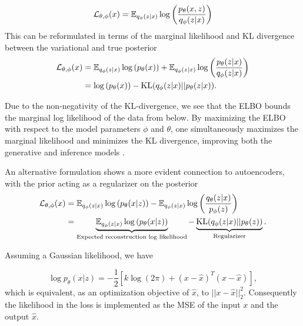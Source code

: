 \documentclass[../../thesis.tex]{subfiles}
\begin{document}
\begin{equation}
    \label{eq:ELBO}
    \mathcal{L}_{\theta,\phi}(x) 
    = \mathbb{E}_{q_\phi(z|x)} \log \left( \frac{p_\theta(x,z)}{q_\phi(z|x)}\right)
\end{equation}
This can be reformulated in terms of the marginal likelihood and KL divergence between the variational and true posterior
\begin{equation}
    \begin{aligned}
        \label{eq:ELBO_loglik}
        \mathcal{L}_{\theta,\phi}(x) 
        &=  \mathbb{E}_{q_\phi(z|x)} \log \left( p_\theta(x)\right) + \mathbb{E}_{q_\phi(z|x)} \log \left( \frac{p_\theta(z|x)}{q_\phi(z|x)}\right) \\
        &= \log \left( p_\theta(x)\right) - \textrm{KL}(q_\phi(z|x)|| p_\theta(z|x)).
    \end{aligned}
\end{equation}

Due to the non-negativity of the KL-divergence, we see that the ELBO bounds the marginal log likelihood of the data from below. By maximizing the ELBO with respect to the model parameters $\phi$ and $\theta$,  one simultaneously maximizes the marginal likelihood and minimizes the KL divergence, improving both the generative and inference models \cite{VAE}.\newline

An alternative formulation shows a more evident connection to autoencoders, with the prior acting as a regularizer on the posterior
\begin{equation}
    \begin{aligned}
        \label{eq:ELBO_AE}
        \mathcal{L}_{\theta,\phi}(x) 
        &=  \mathbb{E}_{q_\phi(z|x)} \log \left( p_\theta(x|z)\right) - \mathbb{E}_{q_\phi(z|x)} \log \left( \frac{q_\theta(z|x)}{p_\phi(z)}\right) \\
        &= \underbrace{\mathbb{E}_{q_\phi(z|x)} \log \left( p_\theta(x|z)\right)}_{\text{Expected reconstruction log likelihood}} - \underbrace{\textrm{KL}(q_\phi(z|x)|| p_\theta(z))}_{\text{Regularizer}}.
    \end{aligned}
\end{equation}

Assuming a Gaussian likelihood, we have

\begin{equation}
    \log p_\theta(x|z) = -\frac12 \left[k\log(2\pi)+ (x-\widehat{x})^T(x-\widehat{x})\right],
\end{equation}
which is equivalent, as an optimization objective of $\widehat{x}$, to $||x-\widehat{x}||_2^2$. Consequently the likelihood in the loss is implemented as the MSE of the input $x$ and the output $\widehat{x}$.
\end{document}
